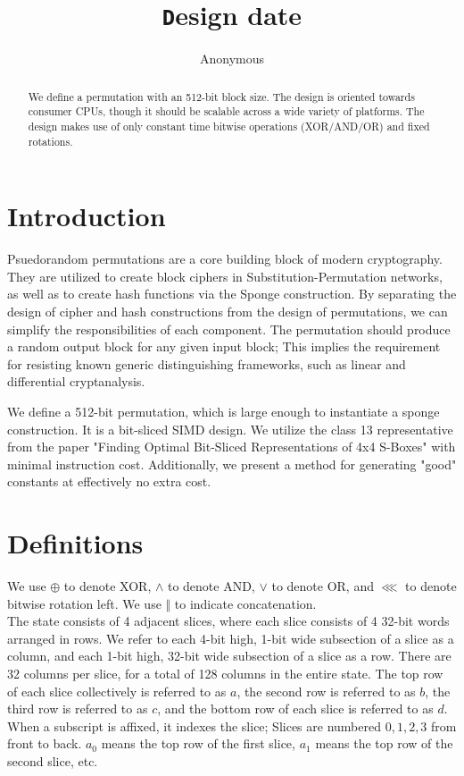 \documentclass[preprint]{iacrtrans}
\author{Anonymous\inst{1}}
\institute{City, State \email{address@provider.com}}
\title[\texttt Design date]{\texttt Design date}
\begin{document}
\maketitle


\begin{abstract}
  We define a permutation with an 512-bit block size. The design is oriented towards consumer CPUs, though it should be scalable across a wide variety of platforms. The design makes use of only constant time bitwise operations (XOR/AND/OR) and fixed rotations. 
\end{abstract}

\todototoc
\listoftodos

\section{Introduction}
 Psuedorandom permutations are a core building block of modern cryptography. They are utilized to create block ciphers in Substitution-Permutation networks, as well as to create hash functions via the Sponge construction. By separating the design of cipher and hash constructions from the design of permutations, we can simplify the responsibilities of each component. The permutation should produce a random output block for any given input block; This implies the requirement for resisting known generic distinguishing frameworks, such as linear and differential cryptanalysis. 

We define a 512-bit permutation, which is large enough to instantiate a sponge construction. It is a bit-sliced SIMD design. We utilize the class 13 representative from the paper "Finding Optimal Bit-Sliced Representations of 4x4 S-Boxes" with minimal instruction cost. Additionally, we present a method for generating "good" constants at effectively no extra cost.

\section{Definitions}
We use $\oplus$ to denote XOR, $\land$ to denote AND, $\lor$ to denote OR, and $\lll$ to denote bitwise rotation left. We use $\Vert$ to indicate concatenation. \\

The state consists of 4 adjacent slices, where each slice consists of 4 32-bit words arranged in rows. We refer to each 4-bit high, 1-bit wide subsection of a slice as a column, and each 1-bit high, 32-bit wide subsection of a slice as a row. There are 32 columns per slice, for a total of 128 columns in the entire state. The top row of each slice collectively is referred to as $a$, the second row is referred to as $b$, the third row is referred to as $c$, and the bottom row of each slice is referred to as $d$. When a subscript is affixed, it indexes the slice; Slices are numbered $0, 1, 2, 3$ from front to back. $a_0$ means the top row of the first slice, $a_1$ means the top row of the second slice, etc.
\end{document}
